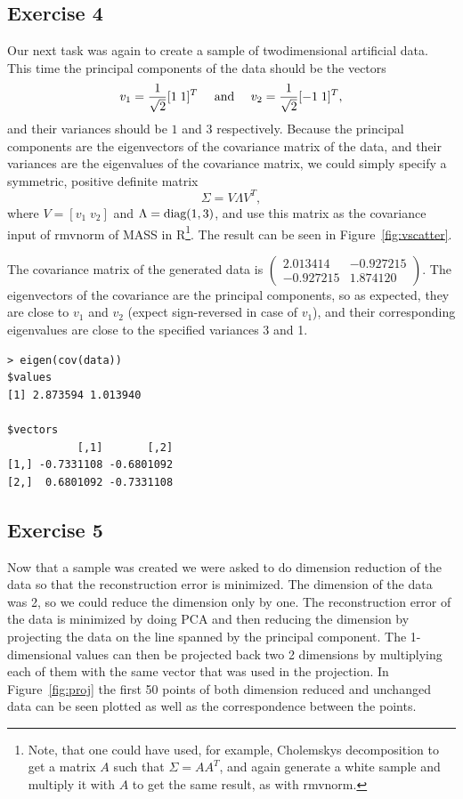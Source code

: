 \documentclass{article}
\begin{document}
\subsection{Exercise 4}\label{sec:subsection4}
Our next task was again to create a sample of twodimensional
artificial data. This time the principal components of the data should
be the vectors 
\[
v_1 = \frac{1}{\sqrt{2}} [1 \; 1]^T \quad \textup{ and } \quad  v_2 = \frac{1}{\sqrt{2}} [-1 \; 1]^T,
\]
and their variances should be $1$ and $3$ respectively. Because the
principal components are the eigenvectors of the covariance matrix of
the data, and their variances are the eigenvalues of the covariance
matrix, we could simply specify a symmetric, positive definite matrix 
\[
\Sigma = V \Lambda V^T,
\]
where $V = [v_1 \; v_2]$ and $\Lambda = \textup{diag}(1,3)$, and use
this matrix as the covariance input of rmvnorm of MASS in R\footnote{Note, that
one could have used, for example, Cholemskys decomposition to get 
a matrix $A$ such that $\Sigma = AA^T$, and again generate a white
sample and multiply it with $A$ to get the same result, as with rmvnorm.}. The
result can be seen in Figure~\ref{fig:vscatter}. 

The covariance matrix of the generated data is
$\left(\begin{smallmatrix}
	2.013414 & -0.927215\\
	-0.927215 & 1.874120
\end{smallmatrix}\right)$. The eigenvectors of the covariance are the principal components, so as expected, they are close to $v_1$ and $v_2$ (expect sign-reversed in case of $v_1$), and their corresponding eigenvalues are close to the specified variances 3 and 1.
\begin{verbatim}
> eigen(cov(data))
$values
[1] 2.873594 1.013940

$vectors
           [,1]       [,2]
[1,] -0.7331108 -0.6801092
[2,]  0.6801092 -0.7331108
\end{verbatim}

\subsection{Exercise 5}
Now that a sample was created we were asked to do dimension reduction
of the data so that the reconstruction error is minimized. The
dimension of the data was 2, so we could reduce the dimension only by
one. The reconstruction error of the data is minimized by doing PCA
and then reducing the dimension by projecting the data on the line
spanned by the principal component.
The 1-dimensional values can then be projected back two 2 dimensions by multiplying each of them with the same vector that was used in the projection.
In Figure~\ref{fig:proj} the first 50 points of both dimension reduced
and unchanged data can be seen plotted as well as the correspondence
between the points.
\end{document}

